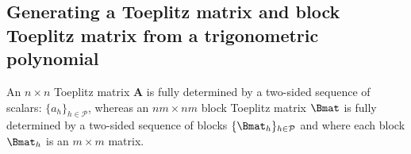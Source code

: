 %
%
%


\subsection{Generating a Toeplitz matrix and block Toeplitz matrix from a trigonometric polynomial}
An $n\times n$ Toeplitz matrix $\mathbf A$ is fully determined by a two-sided sequence of scalars: $\{a_h\}_{h \in \mathcal{P}}$, whereas an $nm\times nm$ block Toeplitz matrix $\Bmat$ is fully determined by a two-sided sequence of blocks $\{\Bmat_h\}_{h \in \mathcal{P}}$ and where each block $\Bmat_h$ is an $m \times m$ matrix.  

